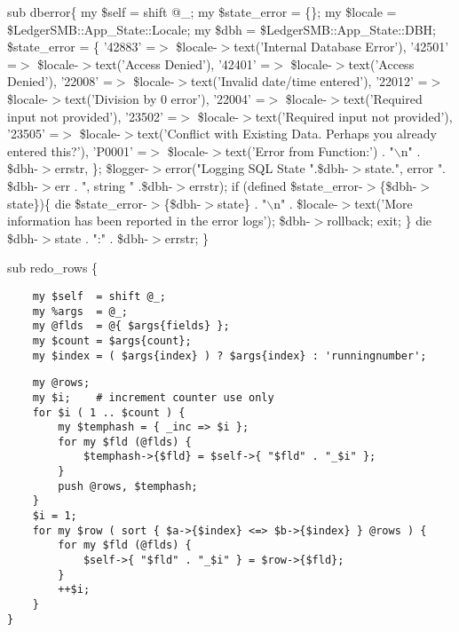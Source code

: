 sub dberror\{
   my \$self = shift @\_;
   my \$state\_error = \{\};
   my \$locale = \$LedgerSMB::App\_State::Locale;
   my \$dbh = \$LedgerSMB::App\_State::DBH;
   \$state\_error = \{
            '42883' =$>$ \$locale-$>$text('Internal Database Error'),
            '42501' =$>$ \$locale-$>$text('Access Denied'),
            '42401' =$>$ \$locale-$>$text('Access Denied'),
            '22008' =$>$ \$locale-$>$text('Invalid date/time entered'),
            '22012' =$>$ \$locale-$>$text('Division by 0 error'),
            '22004' =$>$ \$locale-$>$text('Required input not provided'),
            '23502' =$>$ \$locale-$>$text('Required input not provided'),
            '23505' =$>$ \$locale-$>$text('Conflict with Existing Data.  Perhaps you already entered this?'),
            'P0001' =$>$ \$locale-$>$text('Error from Function:') . "$\backslash$n" .
                    \$dbh-$>$errstr,
   \};
   \$logger-$>$error("Logging SQL State ".\$dbh-$>$state.", error ".
           \$dbh-$>$err . ", string " .\$dbh-$>$errstr);
   if (defined \$state\_error-$>$\{\$dbh-$>$state\})\{
       die \$state\_error-$>$\{\$dbh-$>$state\}
           . "$\backslash$n" . 
          \$locale-$>$text('More information has been reported in the error logs');
       \$dbh-$>$rollback;
       exit;
   \}
   die \$dbh-$>$state . ":" . \$dbh-$>$errstr;
\}



sub redo\_rows \{

\begin{verbatim}
    my $self  = shift @_;
    my %args  = @_;
    my @flds  = @{ $args{fields} };
    my $count = $args{count};
    my $index = ( $args{index} ) ? $args{index} : 'runningnumber';
\end{verbatim}
\begin{verbatim}
    my @rows;
    my $i;    # increment counter use only
    for $i ( 1 .. $count ) {
        my $temphash = { _inc => $i };
        for my $fld (@flds) {
            $temphash->{$fld} = $self->{ "$fld" . "_$i" };
        }
        push @rows, $temphash;
    }
    $i = 1;
    for my $row ( sort { $a->{$index} <=> $b->{$index} } @rows ) {
        for my $fld (@flds) {
            $self->{ "$fld" . "_$i" } = $row->{$fld};
        }
        ++$i;
    }
}
\end{verbatim}


